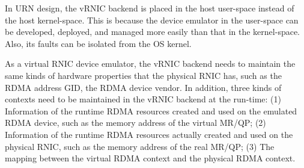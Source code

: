 In URN design, the vRNIC backend is placed in the host user-space instead of the host kernel-space. This is because the device emulator in the user-space can be developed, deployed, and managed more easily than that in the kernel-space. Also, its faults can be isolated from the OS kernel.

As a virtual RNIC device emulator, the vRNIC backend needs to maintain the same kinds of hardware properties that the physical RNIC has, such as the RDMA address GID, the RDMA device vendor. In addition, three kinds of contexts need to be maintained in the vRNIC backend at the run-time:
(1) Information of the runtime RDMA resources created and used on the emulated RDMA device, such as the memory address of the virtual MR/QP;
(2) Information of the runtime RDMA resources actually created and used on the physical RNIC,  such as the memory address of the real MR/QP;
(3) The mapping between the virtual RDMA context and the physical RDMA context.


